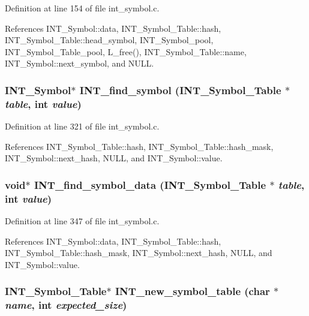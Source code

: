 Definition at line 154 of file int\_\-symbol.c.

References INT\_\-Symbol::data, INT\_\-Symbol\_\-Table::hash, INT\_\-Symbol\_\-Table::head\_\-symbol, INT\_\-Symbol\_\-pool, INT\_\-Symbol\_\-Table\_\-pool, L\_\-free(), INT\_\-Symbol\_\-Table::name, INT\_\-Symbol::next\_\-symbol, and NULL.
\subsubsection{\setlength{\rightskip}{0pt plus 5cm}\bf{INT\_\-Symbol}$\ast$ INT\_\-find\_\-symbol (\bf{INT\_\-Symbol\_\-Table} $\ast$ {\em table}, int {\em value})}\label{int__symbol_8h_4b4e1a84b31fad39d8a62e2920c3f1a2}




Definition at line 321 of file int\_\-symbol.c.

References INT\_\-Symbol\_\-Table::hash, INT\_\-Symbol\_\-Table::hash\_\-mask, INT\_\-Symbol::next\_\-hash, NULL, and INT\_\-Symbol::value.
\subsubsection{\setlength{\rightskip}{0pt plus 5cm}void$\ast$ INT\_\-find\_\-symbol\_\-data (\bf{INT\_\-Symbol\_\-Table} $\ast$ {\em table}, int {\em value})}\label{int__symbol_8h_3022f18360abe8bea56f9cdd41807741}




Definition at line 347 of file int\_\-symbol.c.

References INT\_\-Symbol::data, INT\_\-Symbol\_\-Table::hash, INT\_\-Symbol\_\-Table::hash\_\-mask, INT\_\-Symbol::next\_\-hash, NULL, and INT\_\-Symbol::value.
\subsubsection{\setlength{\rightskip}{0pt plus 5cm}\bf{INT\_\-Symbol\_\-Table}$\ast$ INT\_\-new\_\-symbol\_\-table (char $\ast$ {\em name}, int {\em expected\_\-size})}\label{int__symbol_8h_934c16acb34dcf5ecc68557a95b3ab91}




